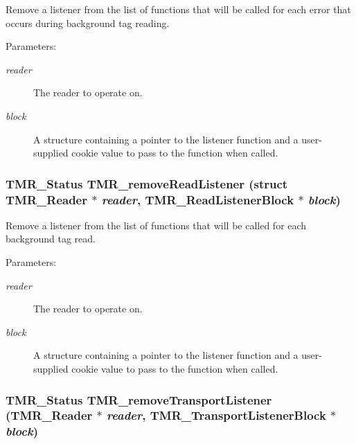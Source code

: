 Remove a listener from the list of functions that will be called for each error that occurs during background tag reading.

\begin{Desc}
\item[Parameters:]
\begin{description}
\item[{\em reader}]The reader to operate on. \item[{\em block}]A structure containing a pointer to the listener function and a user-supplied cookie value to pass to the function when called. \end{description}
\end{Desc}
\hypertarget{group__reader_g702b49e0f99507ffe0361b772b161123}{
\subsubsection[{TMR\_\-removeReadListener}]{\setlength{\rightskip}{0pt plus 5cm}TMR\_\-Status TMR\_\-removeReadListener (struct {\bf TMR\_\-Reader} $\ast$ {\em reader}, \/  {\bf TMR\_\-ReadListenerBlock} $\ast$ {\em block})}}
\label{group__reader_g702b49e0f99507ffe0361b772b161123}


Remove a listener from the list of functions that will be called for each background tag read.

\begin{Desc}
\item[Parameters:]
\begin{description}
\item[{\em reader}]The reader to operate on. \item[{\em block}]A structure containing a pointer to the listener function and a user-supplied cookie value to pass to the function when called. \end{description}
\end{Desc}
\hypertarget{group__reader_g1a07c9bba16ee46f6cc47509bb6d10df}{
\subsubsection[{TMR\_\-removeTransportListener}]{\setlength{\rightskip}{0pt plus 5cm}TMR\_\-Status TMR\_\-removeTransportListener ({\bf TMR\_\-Reader} $\ast$ {\em reader}, \/  {\bf TMR\_\-TransportListenerBlock} $\ast$ {\em block})}}
\label{group__reader_g1a07c9bba16ee46f6cc47509bb6d10df}


